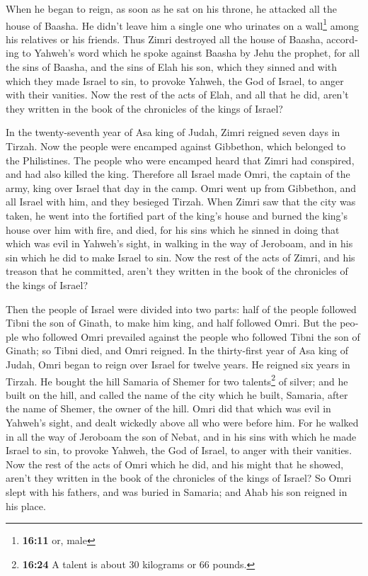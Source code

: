 \begin{paracol}{2}
\begin{otherlanguage}{english}
 When he began to reign, as soon as he sat on his throne,
he attacked all the house of Baasha. He didn't leave him a single one
who urinates on a wall\footnote{\textbf{16:11} or, male} among his
relatives or his friends.  Thus Zimri destroyed all the
house of Baasha, according to Yahweh's word which he spoke against
Baasha by Jehu the prophet,  for all the sins of Baasha,
and the sins of Elah his son, which they sinned and with which they made
Israel to sin, to provoke Yahweh, the God of Israel, to anger with their
vanities.  Now the rest of the acts of Elah, and all that
he did, aren't they written in the book of the chronicles of the kings
of Israel?

 In the twenty-seventh year of Asa king of Judah, Zimri
reigned seven days in Tirzah. Now the people were encamped against
Gibbethon, which belonged to the Philistines.  The people
who were encamped heard that Zimri had conspired, and had also killed
the king. Therefore all Israel made Omri, the captain of the army, king
over Israel that day in the camp.  Omri went up from
Gibbethon, and all Israel with him, and they besieged Tirzah.
 When Zimri saw that the city was taken, he went into the
fortified part of the king's house and burned the king's house over him
with fire, and died,  for his sins which he sinned in
doing that which was evil in Yahweh's sight, in walking in the way of
Jeroboam, and in his sin which he did to make Israel to sin.
 Now the rest of the acts of Zimri, and his treason that
he committed, aren't they written in the book of the chronicles of the
kings of Israel?

 Then the people of Israel were divided into two parts:
half of the people followed Tibni the son of Ginath, to make him king,
and half followed Omri.  But the people who followed Omri
prevailed against the people who followed Tibni the son of Ginath; so
Tibni died, and Omri reigned.  In the thirty-first year
of Asa king of Judah, Omri began to reign over Israel for twelve years.
He reigned six years in Tirzah.  He bought the hill
Samaria of Shemer for two talents\footnote{\textbf{16:24} A talent is
  about 30 kilograms or 66 pounds.} of silver; and he built on the hill,
and called the name of the city which he built, Samaria, after the name
of Shemer, the owner of the hill.  Omri did that which
was evil in Yahweh's sight, and dealt wickedly above all who were before
him.  For he walked in all the way of Jeroboam the son of
Nebat, and in his sins with which he made Israel to sin, to provoke
Yahweh, the God of Israel, to anger with their vanities. 
Now the rest of the acts of Omri which he did, and his might that he
showed, aren't they written in the book of the chronicles of the kings
of Israel?  So Omri slept with his fathers, and was
buried in Samaria; and Ahab his son reigned in his place.


\end{otherlanguage}
\end{paracol}
